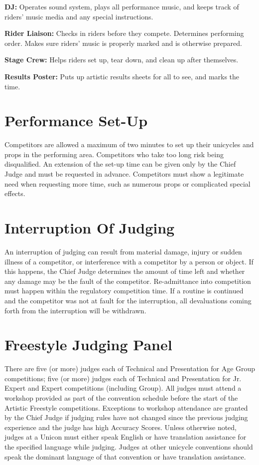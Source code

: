 \textbf{DJ:} Operates sound system, plays all performance music, and keeps track of riders' music media and any special instructions.

\textbf{Rider Liaison:} Checks in riders before they compete.
Determines performing order.
Makes sure riders' music is properly marked and is otherwise prepared.

\textbf{Stage Crew:} Helps riders set up, tear down, and clean up after themselves.

\textbf{Results Poster:} Puts up artistic results sheets for all to see, and marks the time.



\section{Performance Set-Up}
Competitors are allowed a maximum of two minutes to set up their unicycles and props in the performing area.
Competitors who take too long risk being disqualified.
An extension of the set-up time can be given only by the Chief Judge and must be requested in advance.
Competitors must show a legitimate need when requesting more time, such as numerous props or complicated special effects.

\section{Interruption Of Judging}
An interruption of judging can result from material damage, injury or sudden illness of a competitor, or interference with a competitor by a person or object.
If this happens, the Chief Judge determines the amount of time left and whether any damage may be the fault of the competitor.
Re-admittance into competition must happen within the regulatory competition time.
If a routine is continued and the competitor was not at fault for the interruption, all devaluations coming forth from the interruption will be withdrawn.

\section{Freestyle Judging Panel \label{sec:freestyle_judging-panel}}
There are five (or more) judges each of Technical and Presentation for Age Group competitions; five (or more) judges each of Technical and Presentation for Jr. Expert and Expert competitions (including Group).
All judges must attend a workshop provided as part of the convention schedule before the start of the Artistic Freestyle competitions.
Exceptions to workshop attendance are granted by the Chief Judge if judging rules have not changed since the previous judging experience and the judge has high Accuracy Scores.
Unless otherwise noted, judges at a Unicon must either speak English or have translation assistance for the specified language while judging.
Judges at other unicycle conventions should speak the dominant language of that convention or have translation assistance.

